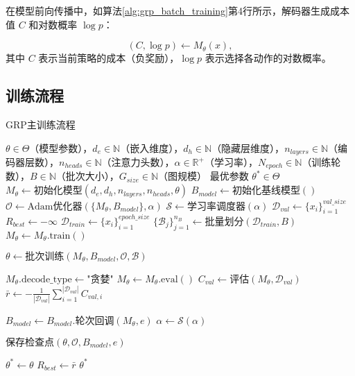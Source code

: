在模型前向传播中，如算法\ref{alg:grp_batch_training}第4行所示，解码器生成成本值 $C$ 和对数概率 $\log p$：

\begin{equation}
	(C, \log p) \leftarrow M_{\theta}(x),
\end{equation}
其中 $C$ 表示当前策略的成本（负奖励），$\log p$ 表示选择各动作的对数概率。

\subsection{训练流程}
\begin{algorithm}[H]
	\begin{algorithmic}[1]
		\caption{GRP主训练流程}
		\label{alg:grp_main_training}
		\Require $\theta \in \Theta$（模型参数），$d_e \in \mathbb{N}$（嵌入维度），$d_h \in \mathbb{N}$（隐藏层维度），$n_{layers} \in \mathbb{N}$（编码器层数），$n_{heads} \in \mathbb{N}$（注意力头数），$\alpha \in \mathbb{R}^{+}$（学习率），$N_{epoch} \in \mathbb{N}$（训练轮数），$B \in \mathbb{N}$（批次大小），$G_{size} \in \mathbb{N}$（图规模）
		\Ensure 最优参数 $\theta^* \in \Theta$
		\State $M_{\theta} \leftarrow \text{初始化模型}(d_e, d_h, n_{layers}, n_{heads}, \theta)$
		\State $B_{model} \leftarrow \text{初始化基线模型}()$
		\State $\mathcal{O} \leftarrow \text{Adam优化器}(\{M_{\theta}, B_{model}\}, \alpha)$
		\State $\mathcal{S} \leftarrow \text{学习率调度器}(\alpha)$
		\State $\mathcal{D}_{val} \leftarrow \{x_i\}_{i=1}^{val\_size}$ 
		\State $R_{best} \leftarrow -\infty$ 
		\State $\mathcal{D}_{train} \leftarrow \{x_i\}_{i=1}^{epoch\_size}$ 
		\State $\{\mathcal{B}_j\}_{j=1}^{n_B} \leftarrow \text{批量划分}(\mathcal{D}_{train}, B)$
		\State $M_{\theta} \leftarrow M_{\theta}.\text{train}()$ 

		\State $\theta \leftarrow \text{批次训练}(M_{\theta}, B_{model}, \mathcal{O}, \mathcal{B})$ 
		\EndFor

		\State $M_{\theta}.\text{decode\_type} \leftarrow \text{"贪婪"}$
		\State $M_{\theta} \leftarrow M_{\theta}.\text{eval}()$
		\State $C_{val} \leftarrow \text{评估}(M_{\theta}, \mathcal{D}_{val})$
		\State $\bar{r} \leftarrow -\frac{1}{|\mathcal{D}_{val}|}\sum_{i=1}^{|\mathcal{D}_{val}|} C_{val,i}$ 

		\State $B_{model} \leftarrow B_{model}.\text{轮次回调}(M_{\theta}, e)$
		\State $\alpha \leftarrow \mathcal{S}(\alpha)$ 

		\State $\text{保存检查点}(\theta, \mathcal{O}, B_{model}, e)$
		\EndIf

		\State $\theta^* \leftarrow \theta$ 
		\State $R_{best} \leftarrow \bar{r}$
		\EndIf
		\EndFor
		\State \Return $\theta^*$
	\end{algorithmic}
\end{algorithm}

